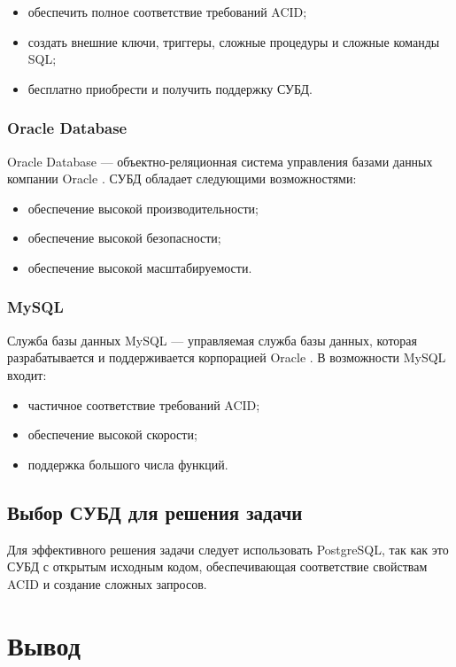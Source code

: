 \begin{itemize}
	\item обеспечить полное соответствие требований ACID;
	\item создать внешние ключи, триггеры, сложные процедуры и сложные команды SQL;
	\item бесплатно приобрести и получить поддержку СУБД.
\end{itemize}

\subsubsection{Oracle Database}

Oracle Database --- объектно-реляционная система управления базами данных компании Oracle \cite{oracle}. СУБД обладает следующими возможностями:

\begin{itemize}
	\item обеспечение высокой производительности;
	\item обеспечение высокой безопасности;
	\item обеспечение высокой масштабируемости.
\end{itemize}

\subsubsection{MySQL}

Служба базы данных MySQL --- управляемая служба базы данных, которая разрабатывается и поддерживается корпорацией Oracle \cite{mysql}. В возможности MySQL входит:

\begin{itemize}
	\item частичное соответствие требований ACID;
	\item обеспечение высокой скорости;
	\item поддержка большого числа функций.
\end{itemize}

\subsection{Выбор СУБД для решения задачи}

Для эффективного решения задачи следует использовать PostgreSQL, так как это СУБД с открытым исходным кодом, обеспечивающая соответствие свойствам ACID и создание сложных запросов.

\section{Вывод}

